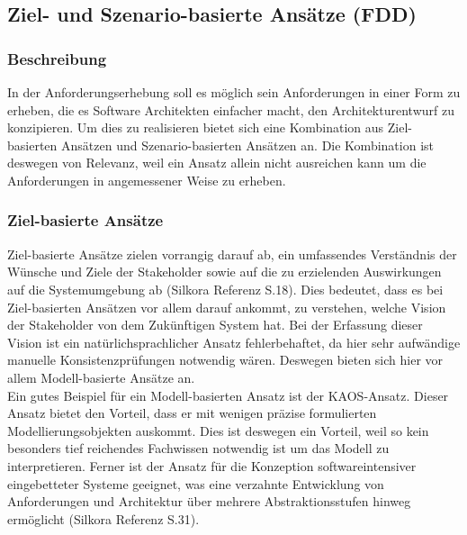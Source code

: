 \subsection{Ziel- und Szenario-basierte Ansätze (FDD)}
\subsubsection{Beschreibung}
In der Anforderungserhebung soll es möglich sein Anforderungen in einer Form zu erheben, die es Software Architekten einfacher macht, den Architekturentwurf zu konzipieren. Um dies zu realisieren bietet sich eine Kombination aus Ziel-basierten Ansätzen und Szenario-basierten Ansätzen an. Die Kombination ist deswegen von Relevanz, weil ein Ansatz allein nicht ausreichen kann um die Anforderungen in angemessener Weise zu erheben.
\subsubsection{Ziel-basierte Ansätze}
Ziel-basierte Ansätze zielen vorrangig darauf ab, ein umfassendes Verständnis der Wünsche und Ziele der Stakeholder sowie auf die zu erzielenden Auswirkungen auf die Systemumgebung ab (Silkora Referenz S.18). Dies bedeutet, dass es bei Ziel-basierten Ansätzen vor allem darauf ankommt, zu verstehen, welche Vision der Stakeholder von dem Zukünftigen System hat. Bei der Erfassung dieser Vision ist ein natürlichsprachlicher Ansatz fehlerbehaftet, da hier sehr aufwändige manuelle Konsistenzprüfungen notwendig wären. Deswegen bieten sich hier vor allem Modell-basierte Ansätze an.\\
Ein gutes Beispiel für ein Modell-basierten Ansatz ist der KAOS-Ansatz. Dieser Ansatz bietet den Vorteil, dass er mit wenigen präzise formulierten Modellierungsobjekten auskommt. Dies ist deswegen ein Vorteil, weil so kein besonders tief reichendes Fachwissen notwendig ist um das Modell zu interpretieren. Ferner ist der Ansatz für die Konzeption softwareintensiver eingebetteter Systeme geeignet, was eine verzahnte Entwicklung von Anforderungen und Architektur über mehrere Abstraktionsstufen hinweg ermöglicht (Silkora Referenz S.31).
